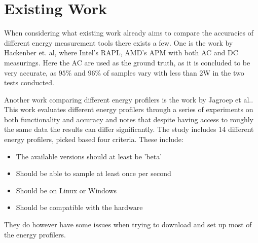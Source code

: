 
\section{Existing Work}

When considering what existing work already aims to compare the accuracies of different energy measurement tools there exists a few. One is the work by Hackenber et. al\cite*[]{Hackenberg2013}, where Intel's RAPL, AMD's APM with both AC and DC measurings. Here the AC are used as the ground truth, as it is concluded to be very accurate, as $95\%$ and $96\%$ of samples vary with less than 2W in the two tests conducted.

Another work comparing different energy profilers is the work by Jagroep et al.\cite[]{Jagroep2015}. This work evaluates different energy profilers through a series of experiments on both functionality and accuracy and notes that despite having access to roughly the same data the results can differ significantly. The study includes 14 different energy profilers, picked based four criteria. These include:


\begin{itemize}
    \item The available versions should at least be 'beta'
    \item Should be able to sample at least once per second
    \item Should be on Linux or Windows
    \item Should be compatible with the hardware
\end{itemize}

They do however have some issues when trying to download and set up most of the energy profilers.

